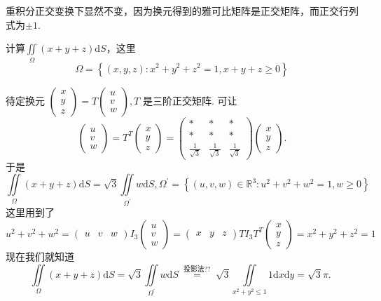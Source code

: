 重积分正交变换下显然不变，因为换元得到的雅可比矩阵是正交矩阵，而正交行列式为$\pm 1$.

\begin{exercise}
    计算$\iint\limits_{\Omega}(x+y+z)\mathrm{d}S$，这里
    \[
        \Omega=\left\{(x,y,z):x^2+y^2+z^2= 1,x+y+z\ge 0 \right\}
    \]
\end{exercise}

\begin{solution}
    待定换元 $\left(\begin{array}{l}x \\ y \\ z\end{array}\right)=T\left(\begin{array}{c}u \\ v \\ w\end{array}\right), T$ 是三阶正交矩阵. 可让
    $$
    \left(\begin{array}{c}
    u \\    
    v \\
    w
    \end{array}\right)=T^T\left(\begin{array}{l}
    x \\    
    y \\
    z
    \end{array}\right)=\left(\begin{array}{ccc}
        * & * & * \\
        * & * & * \\
        \frac{1}{\sqrt{3}} & \frac{1}{\sqrt{3}} & \frac{1}{\sqrt{3}}
    \end{array}\right)\left(\begin{array}{l}
        x \\
        y \\
        z
    \end{array}\right) .
    $$
    于是
$$
\iint\limits_{\Omega}(x+y+z) \mathrm{d} S=\sqrt{3} \iint\limits_{\Omega^{\prime}} w \mathrm{d} S, \Omega^{\prime}=\left\{(u, v, w) \in \mathbb{R}^3: u^2+v^2+w^2=1, w \geqslant 0\right\}
$$
这里用到了
{\small
$$
u^2+v^2+w^2=\left(\begin{array}{lll}
u & v & w
\end{array}\right) I_3\left(\begin{array}{c}
u \\
v \\
w
\end{array}\right)=\left(\begin{array}{lll}
x & y & z
\end{array}\right) T I_3 T^T\left(\begin{array}{l}
x \\
y \\
z
\end{array}\right)=x^2+y^2+z^2=1
$$
}
现在我们就知道
$$
\iint\limits_{\Omega}(x+y+z) \mathrm{d} S=\sqrt{3} \iint\limits_{\Omega^{\prime}} w \mathrm{d} S \stackrel{\text { 投影法?? }}{=} \sqrt{3} \iint\limits_{x^2+y^2 \leqslant 1} 1 \mathrm{d} x \mathrm{d} y=\sqrt{3} \pi \text {. }
$$
\end{solution}


